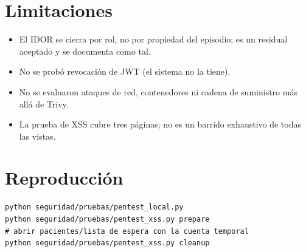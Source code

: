 \documentclass[11pt]{article}
\begin{document}
\section{Limitaciones}

\begin{itemize}
  \item El IDOR se cierra por rol, no por propiedad del episodio; es un
  residual aceptado y se documenta como tal.
  \item No se probó revocación de JWT (el sistema no la tiene).
  \item No se evaluaron ataques de red, contenedores ni cadena de suministro
  más allá de Trivy.
  \item La prueba de XSS cubre tres páginas; no es un barrido exhaustivo de
  todas las vistas.
\end{itemize}

\section{Reproducción}

\begin{verbatim}
python seguridad/pruebas/pentest_local.py
python seguridad/pruebas/pentest_xss.py prepare
# abrir pacientes/lista de espera con la cuenta temporal
python seguridad/pruebas/pentest_xss.py cleanup
\end{verbatim}
\end{document}

